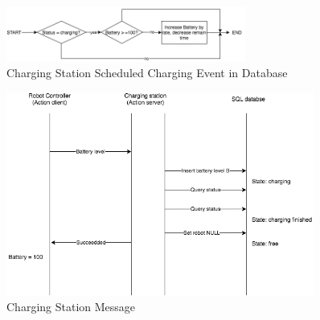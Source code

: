 \begin{figure}[htbp]
    \centering
    \includegraphics[width = 0.7\textwidth]{content/images/ch4/charging_station_charging_event.drawio.png}
    \caption{Charging Station Scheduled Charging Event in Database}
    \label{fig:charging_station_event}
\end{figure}

\begin{figure}[htbp]
    \centering
    \includegraphics[width = 0.9\textwidth]{content/images/ch4/charging_station_message.drawio.png}
    \caption{Charging Station Message}
    \label{fig:charging_station_message}
\end{figure}
